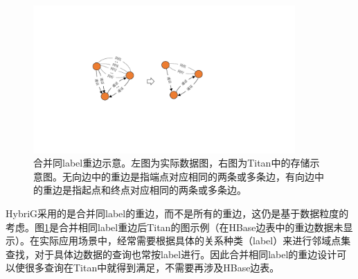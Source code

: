 \begin{figure}[htbp]
\centering
\includegraphics[width=100mm]{fig/merge_edges.pdf}
\caption{合并同label重边示意。左图为实际数据图，右图为Titan中的存储示意图。无向边中的重边是指端点对应相同的两条或多条边，有向边中的重边是指起点和终点对应相同的两条或多条边。}
\label{fig:merge_edges}
\end{figure}

HybriG采用的是合并同label的重边，而不是所有的重边，这仍是基于数据粒度的考虑。图\ref{fig:merge_edges}是合并相同label重边后Titan的图示例（在HBase边表中的重边数据未显示）。在实际应用场景中，经常需要根据具体的关系种类（label）来进行邻域点集查找，对于具体边数据的查询也常按label进行。因此合并相同label的重边设计可以使很多查询在Titan中就得到满足，不需要再涉及HBase边表。


